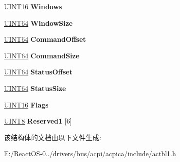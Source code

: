\begin{DoxyCompactItemize}
\hyperlink{_processor_bind_8h_a09f1a1fb2293e33483cc8d44aefb1eb1}{U\+I\+N\+T16} {\bfseries Windows}
\item 
\mbox{\label{structacpi__nfit__control__region_a3ae8d7d8a3de4d544c03cf39eb9fe91e}} 
\hyperlink{_processor_bind_8h_a57be03562867144161c1bfee95ca8f7c}{U\+I\+N\+T64} {\bfseries Window\+Size}
\item 
\mbox{\label{structacpi__nfit__control__region_af3fffca8957105a7b18748ff81453811}} 
\hyperlink{_processor_bind_8h_a57be03562867144161c1bfee95ca8f7c}{U\+I\+N\+T64} {\bfseries Command\+Offset}
\item 
\mbox{\label{structacpi__nfit__control__region_a71ae6860806030b952c60e7f86f4ed0b}} 
\hyperlink{_processor_bind_8h_a57be03562867144161c1bfee95ca8f7c}{U\+I\+N\+T64} {\bfseries Command\+Size}
\item 
\mbox{\label{structacpi__nfit__control__region_a9ca7656c85f1d1b78a26fbead350c6c4}} 
\hyperlink{_processor_bind_8h_a57be03562867144161c1bfee95ca8f7c}{U\+I\+N\+T64} {\bfseries Status\+Offset}
\item 
\mbox{\label{structacpi__nfit__control__region_a79c45fb0bbb18ef7e8c3d1e896c6205f}} 
\hyperlink{_processor_bind_8h_a57be03562867144161c1bfee95ca8f7c}{U\+I\+N\+T64} {\bfseries Status\+Size}
\item 
\mbox{\label{structacpi__nfit__control__region_aacb4a1aa53eb375d673da41832241809}} 
\hyperlink{_processor_bind_8h_a09f1a1fb2293e33483cc8d44aefb1eb1}{U\+I\+N\+T16} {\bfseries Flags}
\item 
\mbox{\label{structacpi__nfit__control__region_ac4f08df68c9ebb93eb9d4c2bac5b3ed3}} 
\hyperlink{_processor_bind_8h_ab27e9918b538ce9d8ca692479b375b6a}{U\+I\+N\+T8} {\bfseries Reserved1} \mbox{[}6\mbox{]}
\end{DoxyCompactItemize}


该结构体的文档由以下文件生成\+:\begin{DoxyCompactItemize}
\item 
E\+:/\+React\+O\+S-\/0../drivers/bus/acpi/acpica/include/actbl1.\+h\end{DoxyCompactItemize}
